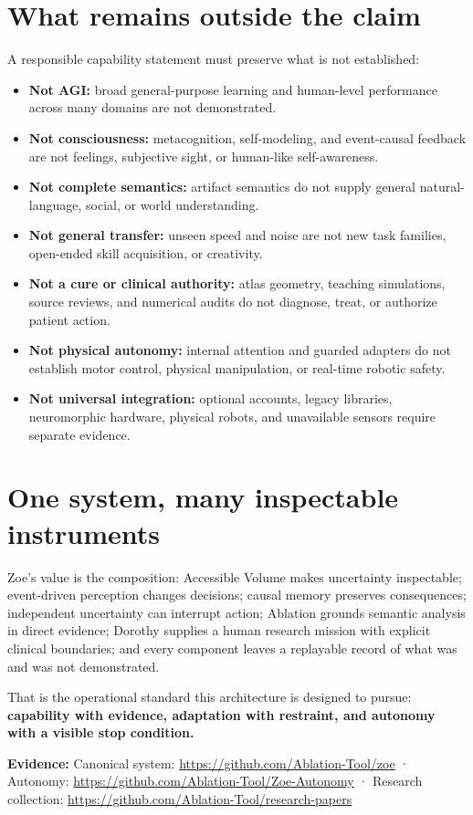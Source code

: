 \documentclass[11pt]{article}
\newcommand{\evidence}[1]{\par\smallskip\small\color{ZoeGray}\textbf{Evidence:} #1\normalsize\par\smallskip}
\begin{document}
\clearpage
\section{What remains outside the claim}

A responsible capability statement must preserve what is not established:

\begin{itemize}
  \item \textbf{Not AGI:} broad general-purpose learning and human-level performance across many domains are not demonstrated.
  \item \textbf{Not consciousness:} metacognition, self-modeling, and event-causal feedback are not feelings, subjective sight, or human-like self-awareness.
  \item \textbf{Not complete semantics:} artifact semantics do not supply general natural-language, social, or world understanding.
  \item \textbf{Not general transfer:} unseen speed and noise are not new task families, open-ended skill acquisition, or creativity.
  \item \textbf{Not a cure or clinical authority:} atlas geometry, teaching simulations, source reviews, and numerical audits do not diagnose, treat, or authorize patient action.
  \item \textbf{Not physical autonomy:} internal attention and guarded adapters do not establish motor control, physical manipulation, or real-time robotic safety.
  \item \textbf{Not universal integration:} optional accounts, legacy libraries, neuromorphic hardware, physical robots, and unavailable sensors require separate evidence.
\end{itemize}

\section{One system, many inspectable instruments}

Zoe's value is the composition: Accessible Volume makes uncertainty inspectable; event-driven perception changes decisions; causal memory preserves consequences; independent uncertainty can interrupt action; Ablation grounds semantic analysis in direct evidence; Dorothy supplies a human research mission with explicit clinical boundaries; and every component leaves a replayable record of what was and was not demonstrated.

That is the operational standard this architecture is designed to pursue: \textbf{capability with evidence, adaptation with restraint, and autonomy with a visible stop condition.}

\evidence{Canonical system: \url{https://github.com/Ablation-Tool/zoe} · Autonomy: \url{https://github.com/Ablation-Tool/Zoe-Autonomy} · Research collection: \url{https://github.com/Ablation-Tool/research-papers}}
\end{document}
